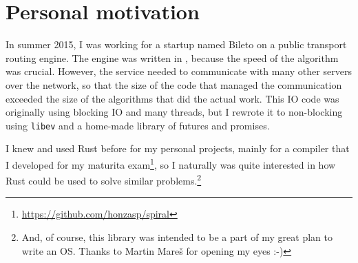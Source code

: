 \section{Personal motivation}

In summer 2015, I was working for a startup named Bileto on a public transport
routing engine. The engine was written in \Cplusplus, because the speed of the
algorithm was crucial. However, the service needed to communicate with many
other servers over the network, so that the size of the code that managed the
communication exceeded the size of the algorithms that did the actual work. This
IO code was originally using blocking IO and many threads, but I rewrote it to
non-blocking using \texttt{libev} and a home-made library of futures and
promises.

I knew and used Rust before for my personal projects, mainly for a compiler that
I developed for my maturita
exam\footnote{\url{https://github.com/honzasp/spiral}}, so I naturally was quite
interested in how Rust could be used to solve similar problems.\footnote{And, of
course, this library was intended to be a part of my great plan to write an OS.
Thanks to Martin Mareš for opening my eyes :-)}
